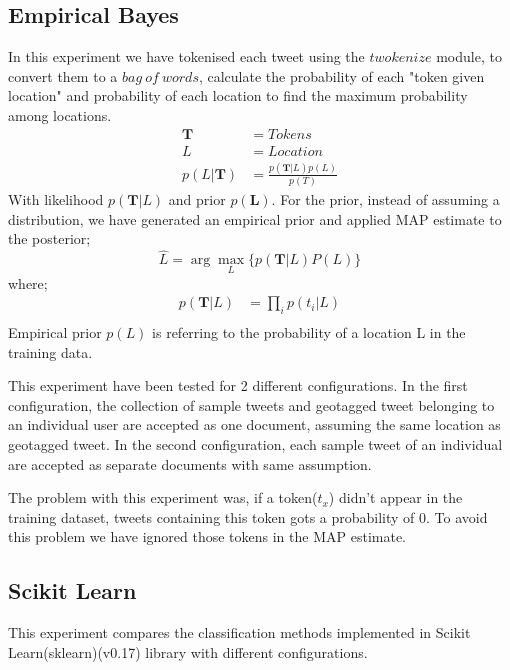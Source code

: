 \documentclass[twoside,11pt]{article}
\begin{document}
\subsection{Empirical Bayes}
In this experiment we have tokenised each tweet using the $twokenize$ module, to convert them to a $bag\ of\ words$, calculate the probability of each "token given location" and probability of each location to find the maximum probability among locations.
\begin{equation*}
\begin{split}
\mathbf{T} &= Tokens \\
L &= Location \\
p(L|\mathbf{T}) &= \frac{p(\mathbf{T} | L)p(L)}{p(T)}
\end{split}
\end{equation*}
With likelihood $p(\mathbf{T} | L)$ and prior $p(\mathbf{L})$. For the prior, instead of assuming a distribution, we have generated an empirical prior and applied MAP estimate to the posterior;
\begin{equation*}
\hat{L} = \arg\max_L\{p(\mathbf{T} | L) P(L)\}
\end{equation*}
where;
\begin{equation*}
\begin{split}
p(\mathbf{T} | L) &= \prod_i{p(t_i|L)}\\
\end{split}
\end{equation*}
Empirical prior $p(L)$ is referring to the probability of a location L in the training data.

This experiment have been tested for 2 different configurations. In the first configuration, the collection of sample tweets and geotagged tweet belonging to an individual user are accepted as one document, assuming the same location as geotagged tweet. In the second configuration, each sample tweet of an individual are accepted as separate documents with same assumption.

The problem with this experiment was, if a token($t_x$) didn't appear in the training dataset, tweets containing this token gots a probability of 0. To avoid this problem we have ignored those tokens in the MAP estimate.

\subsection{Scikit Learn}
This experiment compares the classification methods implemented in Scikit Learn(sklearn)(v0.17) library with different configurations. 
\end{document}
